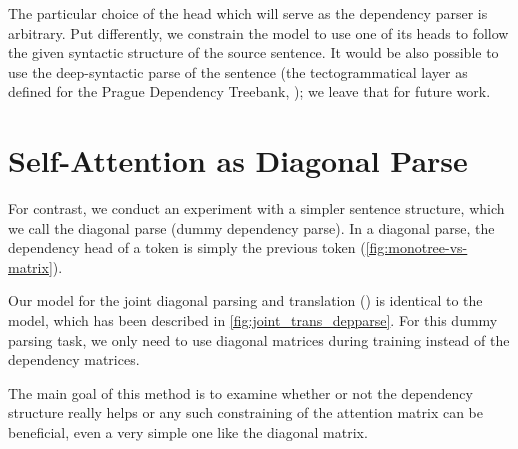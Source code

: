 The particular choice of the head which will serve as the dependency parser is
arbitrary. Put differently, we constrain the \transformer model to use one of its
heads to follow the given syntactic structure of the source sentence. It would be also
possible to use the deep-syntactic parse of the sentence (the
tectogrammatical layer as defined for the Prague Dependency Treebank,
); we leave that for future work.

\section{Self-Attention as Diagonal Parse}
\label{multitask-diagonal}

For contrast, we conduct an experiment with a simpler sentence structure, which we call the diagonal parse (dummy dependency parse). In a diagonal parse, the dependency head of a token is simply the previous token (\cref{fig:monotree-vs-matrix}).

Our model for the joint diagonal parsing and translation (\DiagonalParse) is identical to the \DepParse model, which has been described in \cref{fig:joint_trans_depparse}.
For this dummy parsing task, we only need to use diagonal matrices during training instead of the dependency matrices.

The main goal of this method is to examine whether or not the dependency structure really helps or any such constraining of the attention matrix can be beneficial, even a very simple one like the diagonal matrix. 

